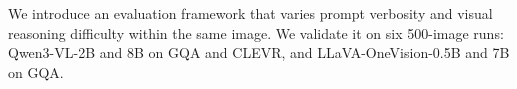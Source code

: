 \documentclass[10pt,twocolumn,letterpaper]{article}
\newcommand{\Cprompt}{C_{\mathrm{prompt}}}
\newcommand{\Cres}{C_{\mathrm{res}}}
\newcommand{\Wt}{W_t(\omega)}
\newcommand{\DF}{\Delta F(\omega)}
\newcommand{\Gt}{G(t)}
\begin{document}
We introduce an evaluation framework that varies prompt verbosity and visual reasoning difficulty within the same image.
%
% 
We validate it on six 500-image runs: Qwen3-VL-2B and 8B on GQA and CLEVR, and LLaVA-OneVision-0.5B and 7B on GQA.
%
% 
%
\end{document}
